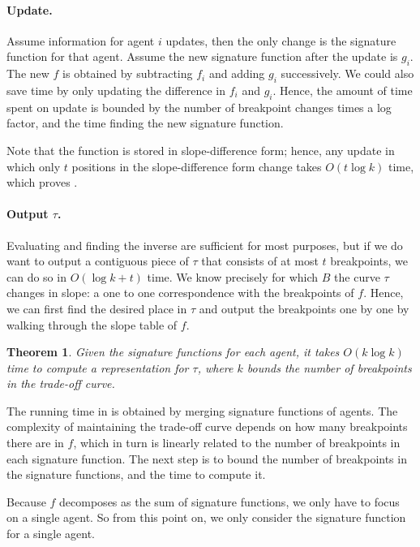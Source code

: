 \documentclass{article}
\newcommand{\lps}{\tau}
\newtheorem{theorem}{Theorem}
\begin{document}
\paragraph{Update.}
Assume information for agent $i$ updates, then the only change is the signature function for that agent. Assume the new signature function after the update is $g_i$. The new $f$ is obtained by subtracting $f_i$ and adding $g_i$ successively. We could also save time by only updating the difference in $f_i$ and $g_i$. Hence, the amount of time spent on update is bounded by the number of breakpoint changes times a log factor, and the time finding the new signature function.

Note that the function is stored in slope-difference form; hence, any update in which only $t$ positions in the slope-difference form change takes $O(t\log k)$ time, which proves .

\paragraph{Output $\lps$.}
Evaluating and finding the inverse are sufficient for most purposes, but if we do want to output a contiguous piece of $\lps$ that consists of at most $t$ breakpoints, we can do so in $O(\log k+t)$ time. We know precisely for which $B$ the curve $\lps$ changes in slope: a one to one correspondence with the breakpoints of $f$. Hence, we can first find the desired place in $\lps$ and output the breakpoints one by one by walking through the slope table of $f$.


\begin{theorem}\label{thm:outeralgorithm}
Given the signature functions for each agent, it takes $O(k\log k)$ time to compute a representation for $\lps$, where $k$ bounds the number of breakpoints in the trade-off curve.
\end{theorem}

The running time in  is obtained by merging signature functions of agents. The complexity of maintaining the trade-off curve depends on how many breakpoints there are in $f$, which in turn is linearly related to the number of breakpoints in each signature function. The next step is to bound the number of breakpoints in the signature functions, and the time to compute it.

Because $f$ decomposes as the sum of signature functions, we only have to focus on a single agent. So from this point on, we only consider the signature function for a single agent.
\end{document}
